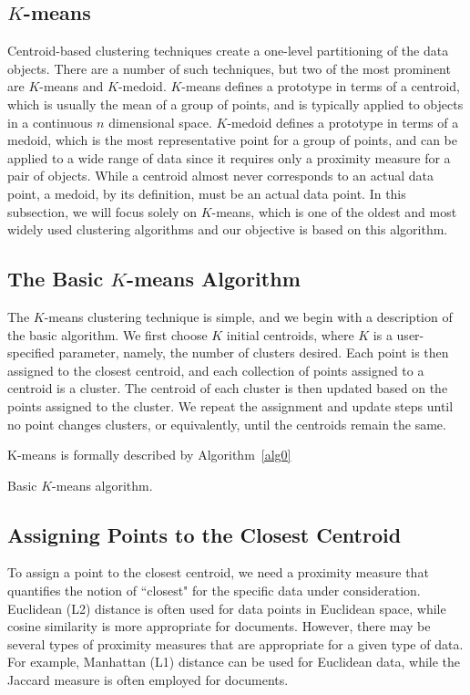 \subsection{$K$-means}
Centroid-based clustering techniques create a one-level partitioning of the
data objects.  There are a number of such techniques, but two of the most
prominent are $K$-means and $K$-medoid. $K$-means defines a prototype in terms
of a centroid, which is usually the mean of a group of points, and is typically
applied to objects in a continuous $n$ dimensional space.  $K$-medoid defines a
prototype in terms of a medoid, which is the most representative point for a
group of points, and can be applied to a wide range of data since it requires
only a proximity measure for a pair of objects. While a centroid almost never
corresponds to an actual data point, a medoid, by its definition, must be an
actual data point.  In this subsection, we will focus solely on $K$-means, which is
one of the oldest and most widely used clustering algorithms and our objective is based on this algorithm.

\subsection{The Basic $K$-means Algorithm}
The $K$-means clustering technique is simple, and we begin with a description
of the basic algorithm. We first choose $K$ initial centroids, where $K$ is a user-specified
parameter, namely, the number of clusters desired.  Each point is
then assigned to the closest centroid, and each collection of points assigned to
a centroid is a cluster. The centroid of each cluster is then updated based on
the points assigned to the cluster. We repeat the assignment and update steps
until no point changes clusters, or equivalently, until the centroids remain the
same.

K-means is formally described by Algorithm~\ref{alg0}

\begin{algorithm}
  \caption{Basic $K$-means algorithm.}
  \label{alg0}
  \begin{algorithmic}
    
  \end{algorithmic}
\end{algorithm}

\subsection{Assigning Points to the Closest Centroid}
To assign a point to the closest centroid, we need a proximity measure that
quantifies the notion of ``closest" for the specific data under consideration.
Euclidean (L2) distance is often used for data points in Euclidean space, while
cosine similarity is more appropriate for documents.  However, there may be
several types of proximity measures that are appropriate for a given type of
data. For example, Manhattan (L1) distance can be used for Euclidean data,
while the Jaccard measure is often employed for documents.

